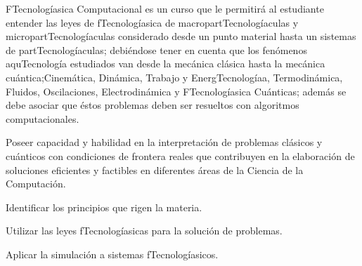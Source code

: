 \begin{syllabus}


\begin{justification}
FTecnologíasica Computacional es un curso que le permitirá al estudiante entender
las leyes de fTecnologíasica de macropartTecnologíaculas y micropartTecnologíaculas considerado desde un
punto material hasta un sistemas de partTecnologíaculas; debiéndose tener en cuenta que los
fenómenos aquTecnología estudiados van desde la mecánica clásica hasta la mecánica cuántica;Cinemática, Dinámica, Trabajo y EnergTecnologíaa, Termodinámica, Fluidos, Oscilaciones, Electrodinámica y FTecnologíasica Cuánticas; 
además se debe asociar que éstos problemas deben ser resueltos con algoritmos computacionales.

Poseer capacidad y habilidad en la interpretación de problemas clásicos y cuánticos 
con condiciones de frontera reales que contribuyen en la elaboración de soluciones eficientes
y factibles en diferentes áreas de la Ciencia de la Computación.
\end{justification}

\begin{goals}
\item Identificar los principios que rigen la materia.
\item Utilizar las leyes fTecnologíasicas para la solución de problemas.
\item Aplicar la simulación a sistemas fTecnologíasicos.
\end{goals}

\begin{outcomes}
  \item {}
  \item {}
  \item {}
\end{outcomes}

\begin{competences}
  \item {} 
  \item {}
  \item {}
\end{competences}


\end{syllabus}
